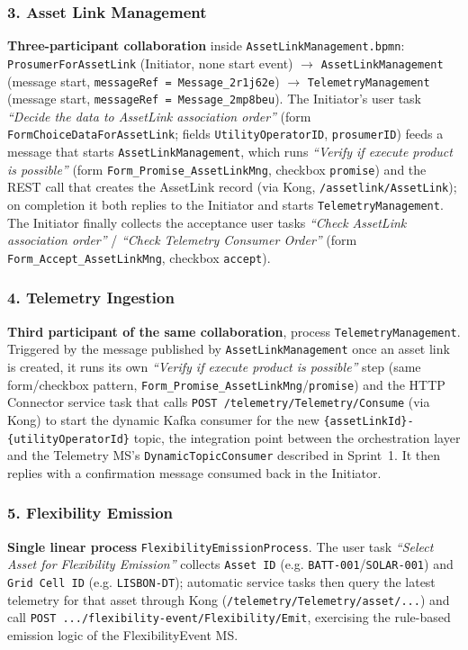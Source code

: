 \documentclass[11pt,a4paper]{article}
\begin{document}
\subsubsection*{3. Asset Link Management}
\textbf{Three-participant collaboration} inside
\texttt{AssetLinkManagement.bpmn}: \texttt{ProsumerForAssetLink} (Initiator,
none start event) $\rightarrow$ \texttt{AssetLinkManagement} (message start,
\texttt{messageRef = Message\_2r1j62e}) $\rightarrow$
\texttt{TelemetryManagement} (message start, \texttt{messageRef =
Message\_2mp8beu}). The Initiator's user task \emph{``Decide the data to
AssetLink association order''} (form \texttt{FormChoiceDataForAssetLink};
fields \texttt{UtilityOperatorID}, \texttt{prosumerID}) feeds a message that
starts \texttt{AssetLinkManagement}, which runs \emph{``Verify if execute
product is possible''} (form \texttt{Form\_Promise\_AssetLinkMng}, checkbox
\texttt{promise}) and the REST call that creates the AssetLink record (via
Kong, \texttt{/assetlink/AssetLink}); on completion it both replies to the
Initiator and starts \texttt{TelemetryManagement}. The Initiator finally
collects the acceptance user tasks \emph{``Check AssetLink association
order''} / \emph{``Check Telemetry Consumer Order''} (form
\texttt{Form\_Accept\_AssetLinkMng}, checkbox \texttt{accept}).
 
\subsubsection*{4. Telemetry Ingestion}
\textbf{Third participant of the same collaboration}, process
\texttt{TelemetryManagement}. Triggered by the message published by
\texttt{AssetLinkManagement} once an asset link is created, it runs its own
\emph{``Verify if execute product is possible''} step (same form/checkbox
pattern, \texttt{Form\_Promise\_AssetLinkMng}/\texttt{promise}) and the HTTP
Connector service task that calls \texttt{POST /telemetry/Telemetry/Consume} (via Kong) to start the dynamic
Kafka consumer for the new \texttt{\{assetLinkId\}-\{utilityOperatorId\}}
topic, the integration point between the orchestration layer and the
Telemetry MS's \texttt{DynamicTopicConsumer} described in Sprint~1. It then replies with a confirmation message
consumed back in the Initiator.
 
\subsubsection*{5. Flexibility Emission}
\textbf{Single linear process} \texttt{FlexibilityEmissionProcess}. The user
task \emph{``Select Asset for Flexibility Emission''} collects \texttt{Asset
ID} (e.g. \texttt{BATT-001}/\texttt{SOLAR-001}) and \texttt{Grid Cell ID}
(e.g. \texttt{LISBON-DT}); automatic service tasks then query the latest
telemetry for that asset through Kong (\texttt{/telemetry/Telemetry/asset/...})
and call \texttt{POST .../flexibility-event/Flexibility/Emit}, exercising the
rule-based emission logic of the FlexibilityEvent MS.
 
\end{document}

